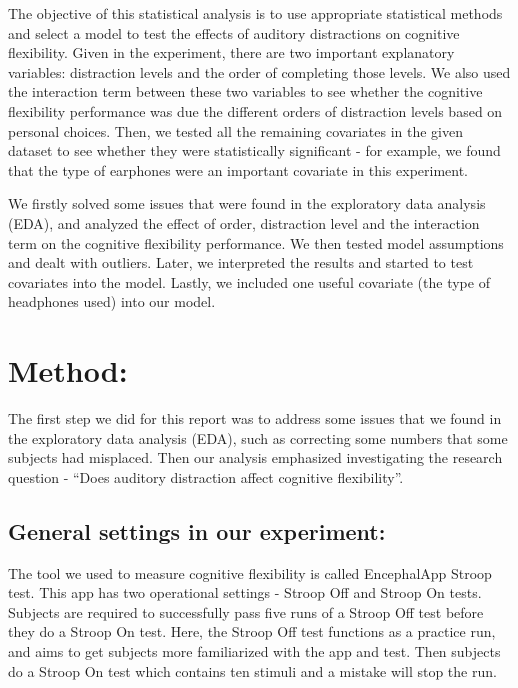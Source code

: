 \documentclass[]{article}
\begin{document}
The objective of this statistical analysis is to use appropriate
statistical methods and select a model to test the effects of auditory
distractions on cognitive flexibility. Given in the experiment, there
are two important explanatory variables: distraction levels and the
order of completing those levels. We also used the interaction term
between these two variables to see whether the cognitive flexibility
performance was due the different orders of distraction levels based on
personal choices. Then, we tested all the remaining covariates in the
given dataset to see whether they were statistically significant - for
example, we found that the type of earphones were an important covariate
in this experiment.

We firstly solved some issues that were found in the exploratory data
analysis (EDA), and analyzed the effect of order, distraction level and
the interaction term on the cognitive flexibility performance. We then
tested model assumptions and dealt with outliers. Later, we interpreted
the results and started to test covariates into the model. Lastly, we
included one useful covariate (the type of headphones used) into our
model.

\hypertarget{method}{%
\section{Method:}\label{method}}

The first step we did for this report was to address some issues that we
found in the exploratory data analysis (EDA), such as correcting some
numbers that some subjects had misplaced. Then our analysis emphasized
investigating the research question - ``Does auditory distraction affect
cognitive flexibility''.

\hypertarget{general-settings-in-our-experiment}{%
\subsection{General settings in our
experiment:}\label{general-settings-in-our-experiment}}

The tool we used to measure cognitive flexibility is called EncephalApp
Stroop test. This app has two operational settings - Stroop Off and
Stroop On tests. Subjects are required to successfully pass five runs of
a Stroop Off test before they do a Stroop On test. Here, the Stroop Off
test functions as a practice run, and aims to get subjects more
familiarized with the app and test. Then subjects do a Stroop On test
which contains ten stimuli and a mistake will stop the run.
\end{document}
